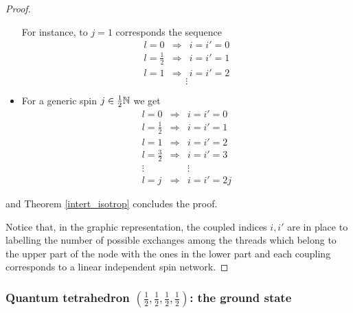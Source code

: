 \begin{proof}
\begin{itemize}
    For instance, to $j=1$ corresponds the sequence 
    $$\begin{matrix}
        l=0&\Rightarrow&i=i'=0\\
        l=\frac{1}{2}&\Rightarrow&i=i'=1\\
        l=1&\Rightarrow&i=i'=2
    \end{matrix}$$
$$\vdots$$
\item For a generic spin $j\in\frac{1}{2}\mathbb{N}$ we get
$$\begin{matrix}
        l=0&\Rightarrow& i=i'=0\\
        l=\frac{1}{2}&\Rightarrow&i=i'=1\\
        l=1&\Rightarrow&i=i'=2\\
        l=\frac{3}{2}&\Rightarrow&i=i'=3\\
        \vdots&\,&\vdots\\
        l=j&\Rightarrow&i=i'=2j
    \end{matrix}$$
\end{itemize}
and Theorem \ref{intert_isotrop} concludes the proof.

Notice that, in the graphic representation, the coupled indices $i,i'$  are in place to labelling the number of possible exchanges among the threads which belong to the upper part of the node with the ones in the lower part and each coupling corresponds to a linear independent spin network.
\end{proof}
\newpage
\subsubsection{Quantum tetrahedron $(\frac{1}{2}, \frac{1}{2}, \frac{1}{2}, \frac{1}{2})$: the ground state}

